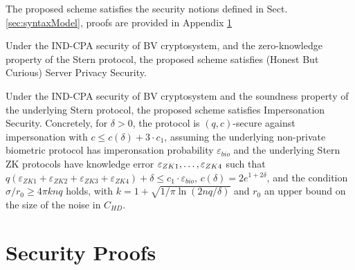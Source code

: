 \begin{description}
\begin{enumerate}
	\end{enumerate}
	The proposed scheme satisfies the security notions defined in Sect. \ref{sec:syntaxModel}, proofs are provided in Appendix
    \ref{append:Proofs}
	\begin{theorem}
		\label{theo:server}
		Under the IND-CPA security of BV cryptosystem, and the zero-knowledge
		property of the Stern protocol, the proposed scheme satisfies (Honest But Curious) Server Privacy Security.
	\end{theorem}
	\begin{theorem}
		\label{theo:client}
		Under the IND-CPA security of BV cryptosystem and the soundness
		property of the underlying Stern protocol, the proposed scheme satisfies Impersonation Security. Concretely, for $\delta>0$, the protocol is $(q,c)$-secure against impersonation with $c \leq c(\delta) + 3 \cdot c_1$, assuming the underlying non-private biometric protocol has imperonsation probability $\varepsilon_{bio}$ and the underlying Stern ZK protocols have knowledge error $\varepsilon_{ZK1},\ldots,\varepsilon_{ZK4}$ such that $q(\varepsilon_{ZK1}+\varepsilon_{ZK2} +
\varepsilon_{ZK3} + \varepsilon_{ZK4}) + \delta \leq c_1 \cdot \varepsilon_{bio}$, $c(\delta) = 2 e^{1+2\delta}$, and the condition $\sigma/r_0 \geq 4 \pi k n q$ holds, with $k = 1 + \sqrt{1/\pi \ln(2nq/\delta)}$ and $r_0$ an upper bound on the size of the noise in $C_{HD}$.
	\end{theorem}

\end{description}

\section{Security Proofs}
\label{append:Proofs}
